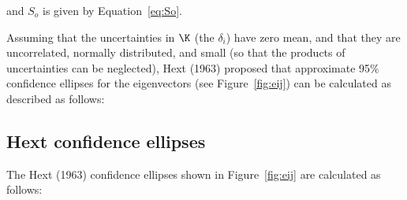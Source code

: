 \noindent and $S_o$ is given by Equation~\ref{eq:So}. 

Assuming that the uncertainties in $\K$ (the $\delta_i$)
 have zero mean, and that they are uncorrelated, normally
distributed, and small (so that the products of uncertainties can
be neglected),  Hext (1963) proposed that approximate 95\% confidence
ellipses for the eigenvectors (see Figure~\ref{fig:eij}) can  be calculated as described as follows:

\subsection{Hext confidence ellipses}
\label{sect:hextE}

The Hext (1963) confidence ellipses shown in Figure~\ref{fig:eij} are calculated as follows: 

